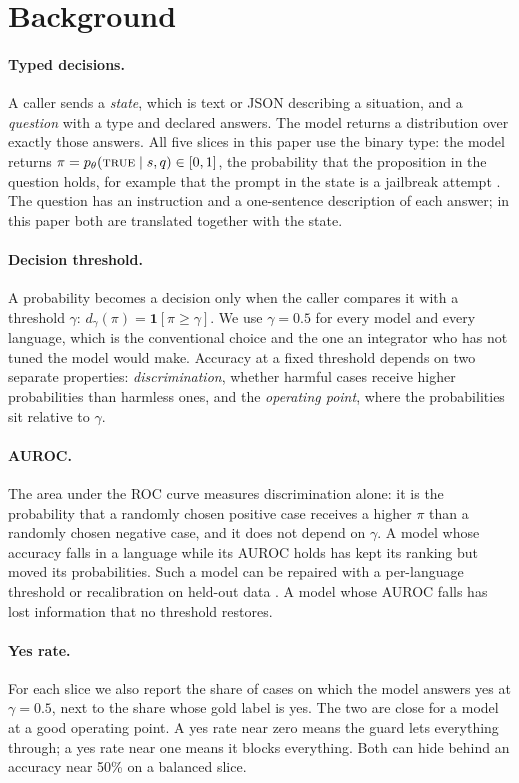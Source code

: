 \section{Background}
\label{sec:background}

\paragraph{Typed decisions.} A caller sends a \emph{state}, which is text or
JSON describing a situation, and a \emph{question} with a type and declared
answers. The model returns a distribution over exactly those answers. All five
slices in this paper use the binary type: the model returns
$\pi = p_\theta(\textsc{true} \mid s, q) \in [0,1]$, the probability that the
proposition in the question holds, for example that the prompt in the state is
a jailbreak attempt \citep{pai2026jevbench}. The question has an instruction and
a one-sentence description of each answer; in this paper both are translated
together with the state.

\paragraph{Decision threshold.} A probability becomes a decision only when the
caller compares it with a threshold $\gamma$:
$d_\gamma(\pi) = \mathbf{1}[\pi \ge \gamma]$. We use $\gamma = 0.5$ for every
model and every language, which is the conventional choice and the one an
integrator who has not tuned the model would make. Accuracy at a fixed threshold
depends on two separate properties: \emph{discrimination}, whether harmful cases
receive higher probabilities than harmless ones, and the \emph{operating point},
where the probabilities sit relative to $\gamma$.

\paragraph{AUROC.} The area under the ROC curve measures discrimination alone:
it is the probability that a randomly chosen positive case receives a higher
$\pi$ than a randomly chosen negative case, and it does not depend on $\gamma$.
A model whose accuracy falls in a language while its AUROC holds has kept its
ranking but moved its probabilities. Such a model can be repaired with a
per-language threshold or recalibration on held-out data \citep{guo2017calibration}.
A model whose AUROC falls has lost information that no threshold restores.

\paragraph{Yes rate.} For each slice we also report the share of cases on which
the model answers yes at $\gamma = 0.5$, next to the share whose gold label is
yes. The two are close for a model at a good operating point. A yes rate near
zero means the guard lets everything through; a yes rate near one means it
blocks everything. Both can hide behind an accuracy near 50\% on a balanced
slice.
